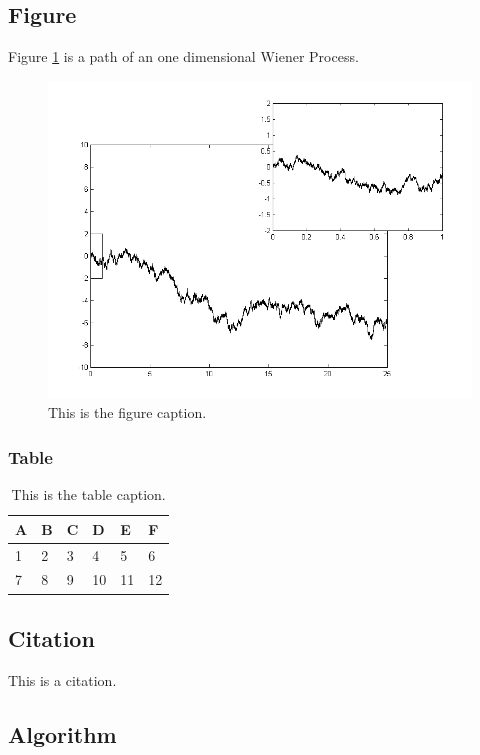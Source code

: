 \documentclass{article}
\begin{document}
\subsection{Figure}

Figure \ref{fig1} is a path of an one dimensional Wiener Process.

\begin{figure}[htbp]
	\centering
	\includegraphics[width=0.7\linewidth]{Wiener_process_zoom}
	\caption{This is the figure caption.}
	\label{fig1}
\end{figure}

\subsubsection{Table}

\begin{table}[htbp]
	\centering
	\begin{tabular}{l|lllll}
		\hline
		A & B & C & D & E  & F \\ \hline
		1 & 2 & 3 & 4 & 5  & 6 \\
		7 & 8 & 9 & 10 & 11 & 12 \\ \hline
	\end{tabular}
	\caption{This is the table caption.}
\end{table}



\subsection{Citation}

This is a citation\cite{Silver2016Mastering,Mnih2015Human,pmlr-v48-mniha16}.


\subsection{Algorithm}
\end{document}
